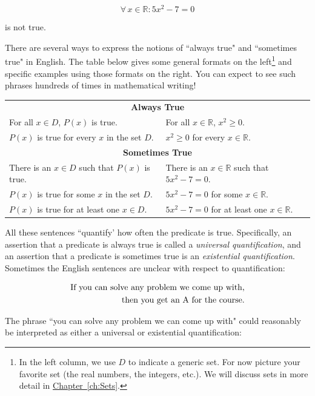 \documentclass[11pt,oneside]{book}
\theoremstyle{definition}
\begin{document}
\[ \forall\, x \in \mathbb{R}: 5x^{2} - 7 = 0 \]

is not true.

There are several ways to express the notions of ``always true" and ``sometimes true" in English.
The table below gives some general formats on the left\footnote{
    In the left column, we use $D$ to indicate a generic set.
    For now picture your favorite set (the real numbers, the integers, etc.).
    We will discuss sets in more detail in \hyperref[ch:Sets]{Chapter~\ref*{ch:Sets}}.
} and specific examples using those formats on the right.
You can expect to see such phrases hundreds of times in mathematical writing!

\begin{center}
    \begin{tabular}{ll}
        \multicolumn{2}{c}{\textbf{Always True}} \\
        For all $x \in D$, $P(x)$ is true. & For all $x \in \mathbb{R}$, $x^{2} \geq 0$. \\
        $P(x)$ is true for every $x$ in the set $D$. & $x^{2} \geq 0$ for every $x \in \mathbb{R}$. \\

        \multicolumn{2}{c}{\textbf{Sometimes True}} \\
        There is an $x \in D$ such that $P(x)$ is true. & There is an $x \in \mathbb{R}$ such that $5x^{2} - 7 = 0$. \\
        $P(x)$ is true for some $x$ in the set $D$. & $5x^{2} - 7 = 0$ for some $x \in \mathbb{R}$. \\
        $P(x)$ is true for at least one $x \in D$. & $5x^{2} - 7 = 0$ for at least one $x \in \mathbb{R}$.
    \end{tabular}
\end{center}

All these sentences ``quantify' how often the predicate is true.
Specifically, an assertion that a predicate is always true is called a \emph{universal quantification}, and an assertion that a predicate is sometimes true is an \emph{existential quantification}.
Sometimes the English sentences are unclear with respect to quantification:

\begin{align}
    \text{If you can solve any problem we come up with,} \notag\\
    \text{then you get an A for the course.} \label{getanA}
\end{align}

The phrase ``you can solve any problem we can come up with" could reasonably be interpreted as either a universal or existential quantification:
\end{document}
